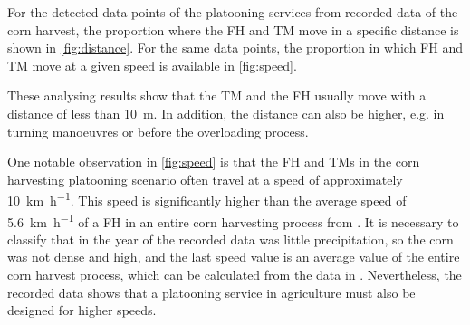 \documentclass[]{nsm-thesis}
\begin{document}
For the detected data points of the platooning services from recorded data of the corn harvest, the proportion where the \ac{FH} and \ac{TM} move in a specific distance is shown in \autoref{fig:distance}. For the same data points, the proportion in which \ac{FH} and \ac{TM} move at a given speed is available in \autoref{fig:speed}.

These analysing results show that the \ac{TM} and the \ac{FH} usually move with a distance of less than \SI{10}{\metre}. In addition, the distance can also be higher, e.g. in turning manoeuvres or before the overloading process.

One notable observation in \autoref{fig:speed} is that the \ac{FH} and \ac{TM}s in the corn harvesting platooning scenario often travel at a speed of approximately \SI{10}{\kilo\metre\per\hour}. This speed is significantly higher than the average speed of \SI{5.6}{\kilo\metre\per\hour} of a \ac{FH} in an entire corn harvesting process from \cite{faustzahlen2018}. It is necessary to classify that in the year of the recorded data was little precipitation, so the corn was not dense and high, and the last speed value is an average value of the entire corn harvest process, which can be calculated from the data in \cite{faustzahlen2018}.
Nevertheless, the recorded data shows that a platooning service in agriculture must also be designed for higher speeds. 
\end{document}
